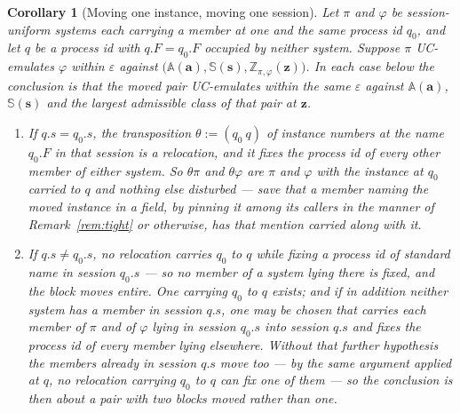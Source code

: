 \documentclass[11pt,a4paper]{article}
\newcommand{\bd}[1]{\mathbf{#1}}
\newcommand{\Aset}{\mathbb{A}}
\newcommand{\SimSet}{\mathbb{S}}
\newcommand{\ZenvSet}{\mathbb{Z}}
\theoremstyle{accentdef}
\theoremstyle{accentplain}
\newtheorem{corollary}[definition]{Corollary}
\begin{document}
\begin{corollary}[Moving one instance, moving one session]\label{cor:moveone}
Let $\pi$ and $\varphi$ be session-uniform systems each carrying a member at one and the same process
id $q_0$, and let $q$ be a process id with $q.F = q_0.F$ occupied by neither system. Suppose $\pi$
UC-emulates $\varphi$ within $\varepsilon$ against
$\bigl(\Aset(\bd{a}),\SimSet(\bd{s}),\ZenvSet_{\pi,\varphi}(\bd{z})\bigr)$. In each case below the
conclusion is that the moved pair UC-emulates within the same $\varepsilon$ against $\Aset(\bd{a})$,
$\SimSet(\bd{s})$ and the largest admissible class of that pair at $\bd{z}$.
\begin{enumerate}[label=(\roman*),leftmargin=2.2em]
  \item If $q.s = q_0.s$, the transposition $\theta := (q_0\ q)$ of instance numbers at the name
        $q_0.F$ in that session is a relocation, and it fixes the process id of every other member
        of either system. So $\theta\pi$ and $\theta\varphi$ are $\pi$ and $\varphi$ with the
        instance at $q_0$ carried to $q$ and nothing else disturbed --- save that a member naming
        the moved instance in a field, by pinning it among its callers in the manner of
        Remark~\ref{rem:tight} or otherwise, has that mention carried along with it.
  \item If $q.s \neq q_0.s$, no relocation carries $q_0$ to $q$
        while fixing a process id of standard name in session $q_0.s$ --- so no member of a system
        lying there is fixed, and the block moves entire. One carrying $q_0$
        to $q$ exists; and if in addition neither system has a member in session $q.s$, one may be
        chosen that carries each member of $\pi$ and of $\varphi$ lying in session $q_0.s$ into
        session $q.s$ and fixes the process id of every member lying elsewhere. Without that
        further hypothesis the members already in session $q.s$ move too --- by the same argument
        applied at $q$, no relocation carrying $q_0$ to $q$ can fix one of them --- so the
        conclusion is then about a pair with two blocks moved rather than one.
\end{enumerate}
\end{corollary}
\end{document}
